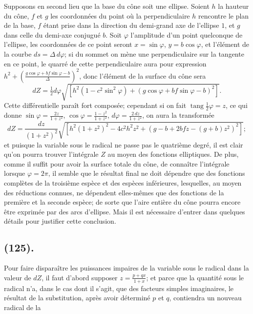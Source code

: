 \documentclass{article}
\begin{document}
Supposons en second lieu que la base du cône soit une ellipse. Soient $h$ la hauteur du cône, $f$ et $g$ les coordonnées du point où la perpendiculaire $h$ rencontre le plan de la base, $f$ étant prise dans la direction du demi-grand axe de l'ellipse $1$, et $g$ dans celle du demi-axe conjugué $b$. Soit $\varphi$ l'amplitude d'un point quelconque de l'ellipse, les coordonnées de ce point seront $x=\sin\varphi$, $y=b\cos\varphi$, et l'élément de la courbe $ds=\Delta\,d\varphi$; si du sommet on mène une perpendiculaire sur la tangente en ce point, le quarré de cette perpendiculaire aura pour expression $h^{2}+\left(\frac{g\cos\varphi+bf\sin\varphi-b}{\Delta}\right)^{2}$, donc l'élément de la surface du cône sera
\[ dZ=\tfrac{1}{2}d\varphi\sqrt{[h^{2}(1-c^{2}\sin^{2}\varphi)+(g\cos\varphi+bf\sin\varphi-b)^{2}]}. \]
Cette différentielle paraît fort composée; cependant si on fait $\operatorname{tang}\frac{1}{2}\varphi=z$, ce qui donne $\sin\varphi=\frac{2z}{1+z^{2}}$, $\cos\varphi=\frac{1-z^{2}}{1+z^{2}}$, $d\varphi=\frac{2\,dz}{1+z^{2}}$, on aura la transformée
\[ dZ=\frac{dz}{(1+z^{2})^{2}}\sqrt{[h^{2}(1+z^{2})^{2}-4c^{2}h^{2}z^{2}+(g-b+2bfz-(g+b)z^{2})^{2}]}; \]
et puisque la variable sous le radical ne passe pas le quatrième degré, il est clair qu'on pourra trouver l'intégrale $Z$ au moyen des fonctions elliptiques. De plus, comme il suffit pour avoir la surface totale du cône, de connaître l'intégrale lorsque $\varphi=2\pi$, il semble que le résultat final ne doit dépendre que des fonctions complètes de la troisième espèce et des espèces inférieures, lesquelles, au moyen des réductions connues, ne dépendent elles-mêmes que des fonctions de la première et la seconde espèce; de sorte que l'aire entière du cône pourra encore être exprimée par des arcs d'ellipse. Mais il est nécessaire d'entrer dans quelques détails pour justifier cette conclusion.

\subsection*{(125).}

Pour faire disparaître les puissances impaires de la variable sous le radical dans la valeur de $dZ$, il faut d'abord supposer $z=\frac{p+qx}{1+x}$; et parce que la quantité sous le radical n'a, dans le cas dont il s'agit, que des facteurs simples imaginaires, le résultat de la substitution, après avoir déterminé $p$ et $q$, contiendra un nouveau radical de la
\end{document}
